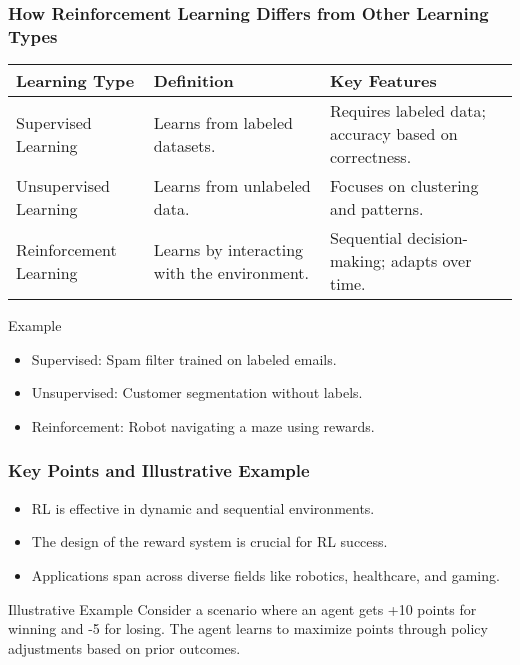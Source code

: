 \documentclass[aspectratio=169]{beamer}
\begin{document}
\begin{frame}[fragile]
    \frametitle{How Reinforcement Learning Differs from Other Learning Types}
    \begin{table}[ht]
        \centering
        \begin{tabular}{|l|l|l|}
            \hline
            \textbf{Learning Type} & \textbf{Definition} & \textbf{Key Features} \\ \hline
            Supervised Learning & Learns from labeled datasets. & Requires labeled data; accuracy based on correctness. \\ \hline
            Unsupervised Learning & Learns from unlabeled data. & Focuses on clustering and patterns. \\ \hline
            Reinforcement Learning & Learns by interacting with the environment. & Sequential decision-making; adapts over time. \\ \hline
        \end{tabular}
    \end{table}
    \begin{block}{Example}
        \begin{itemize}
            \item Supervised: Spam filter trained on labeled emails.
            \item Unsupervised: Customer segmentation without labels.
            \item Reinforcement: Robot navigating a maze using rewards.
        \end{itemize}
    \end{block}
\end{frame}

\begin{frame}[fragile]
    \frametitle{Key Points and Illustrative Example}
    \begin{itemize}
        \item RL is effective in dynamic and sequential environments.
        \item The design of the reward system is crucial for RL success.
        \item Applications span across diverse fields like robotics, healthcare, and gaming.
    \end{itemize}
    \begin{block}{Illustrative Example}
        Consider a scenario where an agent gets +10 points for winning and -5 for losing. The agent learns to maximize points through policy adjustments based on prior outcomes.
    \end{block}
\end{frame}
\end{document}
